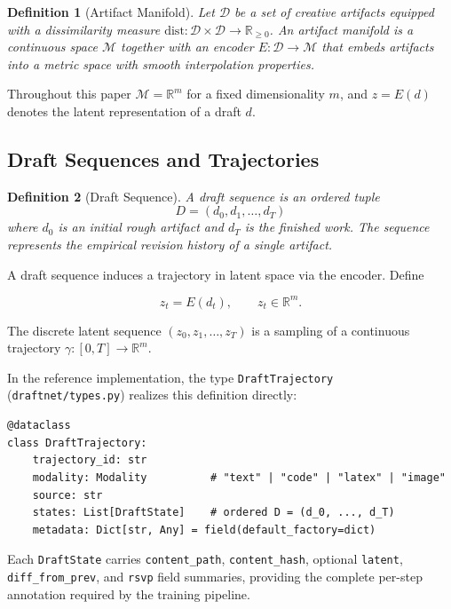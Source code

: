 \documentclass[12pt,a4paper]{article}
\theoremstyle{draftthm}
\newtheorem{definition}{Definition}[section]
\newcommand{\D}{\mathcal{D}}
\newcommand{\Lat}{\mathbb{R}^{m}}
\newcommand{\traj}{\gamma}
\newcommand{\enc}{E}
\newcommand{\code}[1]{\texttt{\small #1}}
\begin{document}
\begin{definition}[Artifact Manifold]
  Let $\D$ be a set of creative artifacts equipped with a dissimilarity measure $\mathrm{dist}: \D \times \D \to \mathbb{R}_{\geq 0}$. An \emph{artifact manifold} is a continuous space $\mathcal{M}$ together with an encoder $\enc: \D \to \mathcal{M}$ that embeds artifacts into a metric space with smooth interpolation properties.
\end{definition}

Throughout this paper $\mathcal{M} = \Lat$ for a fixed dimensionality $m$, and $z = \enc(d)$ denotes the latent representation of a draft $d$.

\subsection{Draft Sequences and Trajectories}

\begin{definition}[Draft Sequence]
  A \emph{draft sequence} is an ordered tuple
  \begin{equation}
    D = (d_0, d_1, \dots, d_T)
  \end{equation}
  where $d_0$ is an initial rough artifact and $d_T$ is the finished work. The sequence represents the empirical revision history of a single artifact.
\end{definition}

A draft sequence induces a trajectory in latent space via the encoder. Define

\begin{equation}
  z_t = \enc(d_t), \qquad z_t \in \Lat.
\end{equation}

The discrete latent sequence $(z_0, z_1, \dots, z_T)$ is a sampling of a continuous trajectory $\traj: [0,T] \to \Lat$.

In the reference implementation, the type \code{DraftTrajectory} (\code{draftnet/types.py}) realizes this definition directly:

\begin{lstlisting}
@dataclass
class DraftTrajectory:
    trajectory_id: str
    modality: Modality          # "text" | "code" | "latex" | "image"
    source: str
    states: List[DraftState]    # ordered D = (d_0, ..., d_T)
    metadata: Dict[str, Any] = field(default_factory=dict)
\end{lstlisting}

Each \code{DraftState} carries \code{content\_path}, \code{content\_hash}, optional \code{latent}, \code{diff\_from\_prev}, and \code{rsvp} field summaries, providing the complete per-step annotation required by the training pipeline.
\end{document}
